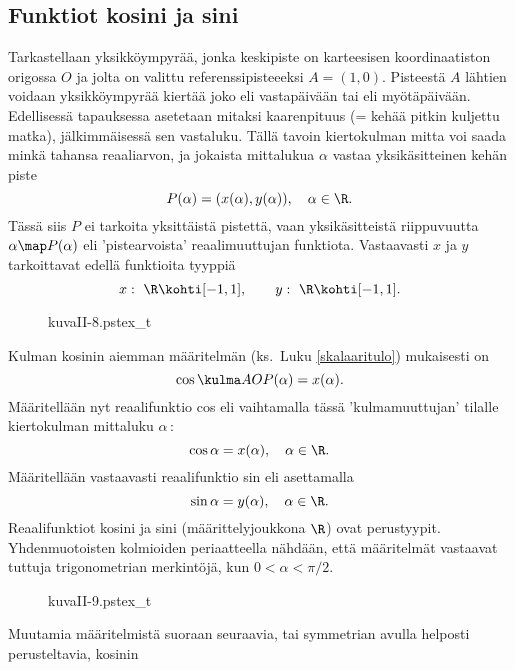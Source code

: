 \pagebreak

\subsection{Funktiot kosini ja sini}

Tarkastellaan yksikköympyrää, jonka keskipiste on karteesisen koordinaatiston origossa $O$ ja
jolta on valittu referenssipisteeeksi $A=(1,0)$. Pisteestä $A$ lähtien voidaan yksikköympyrää
kiertää joko  eli vastapäivään tai
 eli myötäpäivään. Edellisessä tapauksessa asetetaan
 mitaksi kaarenpituus (= kehää pitkin kuljettu matka), jälkimmäisessä sen
vastaluku. Tällä tavoin kiertokulman mitta voi saada minkä tahansa reaaliarvon, ja jokaista
mittalukua $\alpha$ vastaa yksikäsitteinen kehän piste
\[
P(\alpha)=(x(\alpha),y(\alpha)), \quad \alpha \in \R.
\]
Tässä siis $P$ ei tarkoita yksittäistä pistettä, vaan yksikäsitteistä riippuvuutta 
$\alpha \map P(\alpha)$ eli 'pistearvoista' reaalimuuttujan funktiota. Vastaavasti $x$ ja $y$
tarkoittavat edellä funktioita tyyppiä
\[
x: \ \R \kohti [-1,1], \qquad y: \ \R \kohti [-1,1].
\]
\begin{figure}[H]
\begin{center}
{kuvaII-8.pstex_t}
\end{center}
\end{figure}
Kulman kosinin aiemman määritelmän (ks.\ Luku \ref{skalaaritulo}) mukaisesti on
\[
\cos\kulma AOP(\alpha) = x(\alpha).
\]
Määritellään nyt reaalifunktio cos eli  vaihtamalla tässä
'kulmamuuttujan' tilalle kiertokulman mittaluku $\alpha$\,:
\[
\cos\alpha = x(\alpha), \quad \alpha\in\R.
\]
Määritellään vastaavasti reaalifunktio sin eli  asettamalla
\[
\sin\alpha = y(\alpha), \quad \alpha \in \R. 
\]
Reaalifunktiot kosini ja sini (määrittelyjoukkona $\R$) ovat 
perustyypit. Yhdenmuotoisten kolmioiden periaatteella nähdään, että määritelmät vastaavat 
tuttuja trigonometrian merkintöjä, kun $0 < \alpha < \pi/2$.
\begin{figure}[H]
\begin{center}
{kuvaII-9.pstex_t}
\end{center}
\end{figure}
Muutamia määritelmistä suoraan seuraavia, tai symmetrian avulla helposti perusteltavia, kosinin
